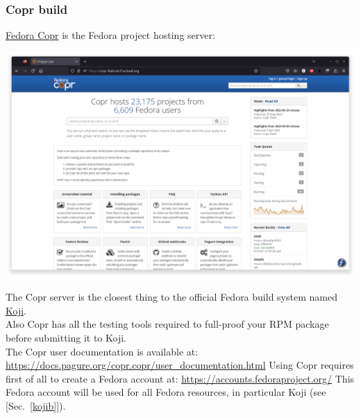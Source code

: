\subsubsection{Copr build}
\label{coprb}
\href{https://copr.fedorainfracloud.org}{Fedora Copr} is the Fedora project hosting server: 
\begin{center}
\includegraphics[width=1.0\textwidth,keepaspectratio=true,draft=\ddst]{img/rpms/copr.eps}
\end{center}
The Copr server is the closest thing to the official Fedora build system named \href{https://koji.fedoraproject.org/koji}{Koji}. \\
Also Copr has all the testing tools required to full-proof your RPM package before submitting it to Koji. \\[0.25cm]
The Copr user documentation is available at: \\[0.25cm]
\href{https://docs.pagure.org/copr.copr/user\_documentation.html}{https://docs.pagure.org/copr.copr/user\_documentation.html}
\newpage
\noindent Using Copr requires first of all to create a Fedora account at: \href{https://accounts.fedoraproject.org/}{https://accounts.fedoraproject.org/}
This Fedora account will be used for all Fedora resources, in particular Koji (see [Sec.~\ref{kojib}]). 
